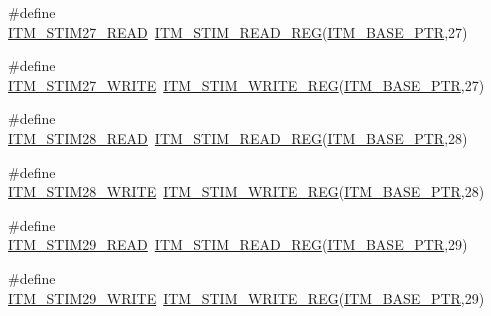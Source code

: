 \begin{DoxyCompactItemize}
\item 
\#define \hyperlink{group___i_t_m___register___accessor___macros_gad396bfbe5ecd26d08ddcdeb9102e28d2}{I\+T\+M\+\_\+\+S\+T\+I\+M27\+\_\+\+R\+E\+AD}~\hyperlink{group___i_t_m___register___accessor___macros_ga5009882336aadcd4f37b45cf3395c450}{I\+T\+M\+\_\+\+S\+T\+I\+M\+\_\+\+R\+E\+A\+D\+\_\+\+R\+EG}(\hyperlink{group___i_t_m___peripheral_gafaddee8fe8b6a898d4e5edc43ee0d703}{I\+T\+M\+\_\+\+B\+A\+S\+E\+\_\+\+P\+TR},27)
\item 
\#define \hyperlink{group___i_t_m___register___accessor___macros_gae1575242a2ddb0a6d0089f2f49072265}{I\+T\+M\+\_\+\+S\+T\+I\+M27\+\_\+\+W\+R\+I\+TE}~\hyperlink{group___i_t_m___register___accessor___macros_ga049ca92a4e78e77c19af81e51aa73f1c}{I\+T\+M\+\_\+\+S\+T\+I\+M\+\_\+\+W\+R\+I\+T\+E\+\_\+\+R\+EG}(\hyperlink{group___i_t_m___peripheral_gafaddee8fe8b6a898d4e5edc43ee0d703}{I\+T\+M\+\_\+\+B\+A\+S\+E\+\_\+\+P\+TR},27)
\item 
\#define \hyperlink{group___i_t_m___register___accessor___macros_gaeedb9934131b7f1d727aab5f0282751f}{I\+T\+M\+\_\+\+S\+T\+I\+M28\+\_\+\+R\+E\+AD}~\hyperlink{group___i_t_m___register___accessor___macros_ga5009882336aadcd4f37b45cf3395c450}{I\+T\+M\+\_\+\+S\+T\+I\+M\+\_\+\+R\+E\+A\+D\+\_\+\+R\+EG}(\hyperlink{group___i_t_m___peripheral_gafaddee8fe8b6a898d4e5edc43ee0d703}{I\+T\+M\+\_\+\+B\+A\+S\+E\+\_\+\+P\+TR},28)
\item 
\#define \hyperlink{group___i_t_m___register___accessor___macros_gadf3581234ae31f01dc8bbc5fe2d5fa06}{I\+T\+M\+\_\+\+S\+T\+I\+M28\+\_\+\+W\+R\+I\+TE}~\hyperlink{group___i_t_m___register___accessor___macros_ga049ca92a4e78e77c19af81e51aa73f1c}{I\+T\+M\+\_\+\+S\+T\+I\+M\+\_\+\+W\+R\+I\+T\+E\+\_\+\+R\+EG}(\hyperlink{group___i_t_m___peripheral_gafaddee8fe8b6a898d4e5edc43ee0d703}{I\+T\+M\+\_\+\+B\+A\+S\+E\+\_\+\+P\+TR},28)
\item 
\#define \hyperlink{group___i_t_m___register___accessor___macros_ga91514a35de0d63d08518557abf3a4092}{I\+T\+M\+\_\+\+S\+T\+I\+M29\+\_\+\+R\+E\+AD}~\hyperlink{group___i_t_m___register___accessor___macros_ga5009882336aadcd4f37b45cf3395c450}{I\+T\+M\+\_\+\+S\+T\+I\+M\+\_\+\+R\+E\+A\+D\+\_\+\+R\+EG}(\hyperlink{group___i_t_m___peripheral_gafaddee8fe8b6a898d4e5edc43ee0d703}{I\+T\+M\+\_\+\+B\+A\+S\+E\+\_\+\+P\+TR},29)
\item 
\#define \hyperlink{group___i_t_m___register___accessor___macros_gaf42116fa71e252ae421c078e1de7058b}{I\+T\+M\+\_\+\+S\+T\+I\+M29\+\_\+\+W\+R\+I\+TE}~\hyperlink{group___i_t_m___register___accessor___macros_ga049ca92a4e78e77c19af81e51aa73f1c}{I\+T\+M\+\_\+\+S\+T\+I\+M\+\_\+\+W\+R\+I\+T\+E\+\_\+\+R\+EG}(\hyperlink{group___i_t_m___peripheral_gafaddee8fe8b6a898d4e5edc43ee0d703}{I\+T\+M\+\_\+\+B\+A\+S\+E\+\_\+\+P\+TR},29)

\end{DoxyCompactItemize}
